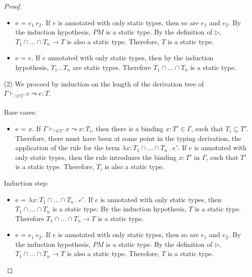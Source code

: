 \documentclass[a4paper]{article}
\begin{document}
\begin{proof}
\begin{itemize}
\begin{itemize}
    \end{itemize}
    \item e = $e_1\ e_2$.
    If $e$ is annotated with only static types, then so are $e_1$ and $e_2$.
    By the induction hypothesis, $PM$ is a static type.
    By the definition of $\rhd$, $T_1 \cap \ldots \cap T_n \rightarrow T$ is also a static type.
    Therefore, $T$ is a static type.
    \item e = $e$.
    If $e$ annotated with only static types, then by the induction hypothesis, $T_1 \ldots T_n$ are static types.
    Therefore $T_1 \cap \ldots \cap T_n$ is a static type.
\end{itemize}
(2) We proceed by induction on the length of the derivation tree of $\Gamma \vdash_{\cap CC} e \leadsto e : T$.\\\\
Base cases:
\begin{itemize}
    \item e = $x$.
    If $\Gamma \vdash_{\cap CC} x \leadsto x : T_i$, then there is a binding $x : T' \in \Gamma$, such that $T_i \subseteq T'$.
    Therefore, there must have been at some point in the typing derivation, the application of the rule for the term $\lambda x : T_1 \cap \ldots \cap T_n\ .\ e'$.
    If $e$ is annotated with only static types, then the rule introduzes the binding $x : T'$ in $\Gamma$, such that $T'$ is a static type.
    Therefore, $T_i$ is also a static type.
\end{itemize}
Induction step:
\begin{itemize}
    \item e = $\lambda x : T_1 \cap \ldots \cap T_n\ .\ e'$.
    If $e$ is annotated with only static types, then $T_1 \cap \ldots \cap T_n$ is a static type.
    By the induction hypothesis, $T$ is a static type.
    Therefore $T_1 \cap \ldots \cap T_n \rightarrow T$ is a static type.
    \item e = $e_1\ e_2$.
    If $e$ is annotated with only static types, then so are $e_1$ and $e_2$.
    By the induction hypothesis, $PM$ is a static type.
    By the definition of $\rhd$, $T_1 \cap \ldots \cap T_n \rightarrow T$ is also a static type.
    Therefore, $T$ is a static type.
\end{itemize}
\end{proof}
\end{document}
